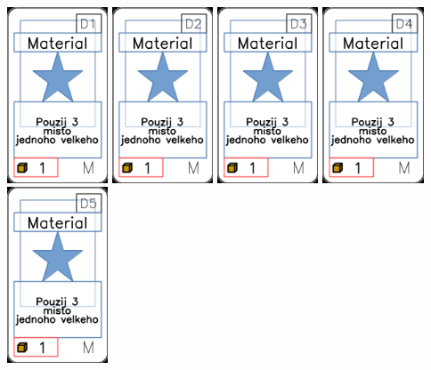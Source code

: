 \documentclass[a4paper]{article}
\begin{document}
	\includegraphics[width=3.0cm]{img-1_45}
	\includegraphics[width=3.0cm]{img-1_46}
	\includegraphics[width=3.0cm]{img-1_47}
	\includegraphics[width=3.0cm]{img-1_48}
	\includegraphics[width=3.0cm]{img-1_49}
\end{document}
